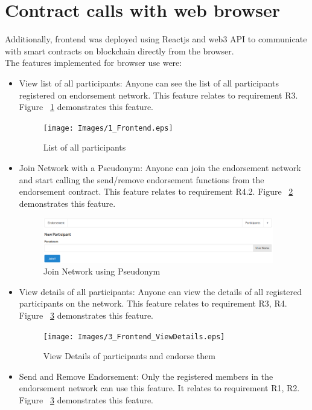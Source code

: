 \section{Contract calls with web browser}
Additionally, frontend was deployed using Reactjs and web3 API to communicate
with smart contracts on blockchain directly from the browser. \\
The features implemented for browser use were: \\
\begin{itemize}
	\item View list of all participants: Anyone can see the list of all
	participants registered on endorsement network. This feature relates to
	requirement R3. Figure ~\ref{listall} demonstrates this feature.   
	\begin{figure}[h]
		\texttt{[image: Images/1\_Frontend.eps]} 
		\caption{List of all participants} 
		\label{listall}
	\end{figure}
	\item Join Network with a Pseudonym: Anyone can join the endorsement
	network and start calling the send/remove endorsement functions from the
	endorsement contract. This feature relates to requirement R4.2. Figure ~\ref{joinNetwork} demonstrates this feature. 
	\begin{figure}[h]
		\includegraphics[width=0.95\textwidth]{Images/2_Frontend_JoinNetwork.eps} 
		\caption{Join Network using Pseudonym} 
		\label{joinNetwork}
	\end{figure}
	\item View details of all participants: Anyone can view the details of all
	registered participants on the network. This feature relates to requirement
	R3, R4. Figure ~\ref{viewDetails} demonstrates this feature. 
		\begin{figure}[h]
		\texttt{[image: Images/3\_Frontend\_ViewDetails.eps]} 
		\caption{View Details of participants and endorse them} 
		\label{viewDetails}
	\end{figure}
	\item Send and Remove Endorsement: Only the registered members in the
	endorsement network can use this feature. It relates to requirement R1, R2. Figure ~\ref{viewDetails} demonstrates this feature. 
\end{itemize}


